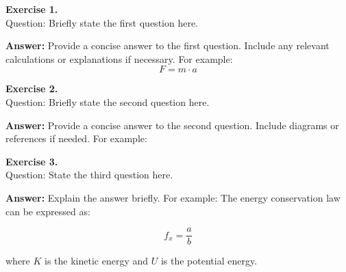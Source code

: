 \textbf{Exercise 1.} \\
Question: Briefly state the first question here.

\textbf{Answer:} Provide a concise answer to the first question. Include any relevant calculations or explanations if necessary. For example:
\[
F = m \cdot a
\]

\vspace{1em}

\textbf{Exercise 2.} \\
Question: Briefly state the second question here.

\textbf{Answer:} Provide a concise answer to the second question. Include diagrams or references if needed. For example:

\vspace{1em}

\textbf{Exercise 3.} \\
Question: State the third question here.

\textbf{Answer:} Explain the answer briefly. For example:
The energy conservation law can be expressed as:

\[
f_{x} = \frac{a}{b}
\]

where \(K\) is the kinetic energy and \(U\) is the potential energy.

